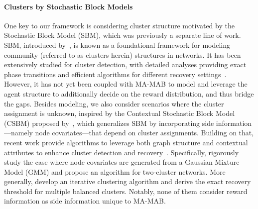 \paragraph{Clusters by Stochastic Block Models} 
One key to our framework is considering cluster structure motivated by the Stochastic Block Model (SBM), which was previously a separate line of work. SBM, introduced by~\citep{holland1983stochastic}, is known as a foundational framework for modeling community (referred to as clusters herein) structures in networks. It has been extensively studied for cluster detection, with detailed analyses providing exact phase transitions and efficient algorithms for different recovery settings~\citep{abbe2018community}. However, it has not yet been coupled with MA-MAB to model and leverage the agent structure to additionally decide on the reward distribution, and thus bridge the gaps. Besides modeling, we also consider scenarios where the cluster assignment is unknown, inspired by the Contextual Stochastic Block Model (CSBM) proposed by~\citep{deshpande2018contextual}, which generalizes SBM by incorporating side information—namely node covariates—that depend on cluster assignments. Building on that, recent work provide algorithms to leverage both graph structure and contextual attributes to enhance cluster detection and recovery~\citep{deshpande2018contextual,abbe2022,braun2022iterative,dreveton2024exact}. Specifically, \citep{abbe2022} rigorously study the case where node covariates are generated from a Gaussian Mixture Model (GMM) and propose an algorithm for two-cluster networks. More generally, \citep{braun2022iterative} develop an iterative clustering algorithm and derive the exact recovery threshold for multiple balanced clusters. Notably, none of them consider reward information as side information unique to MA-MAB. 


